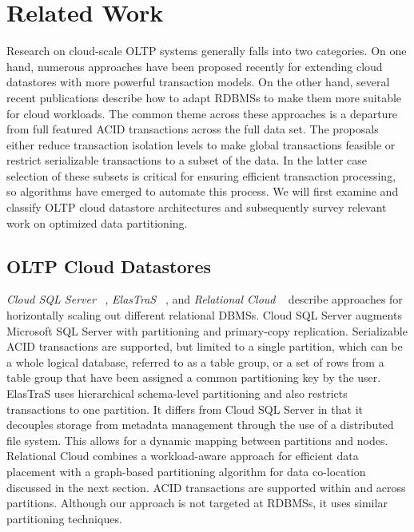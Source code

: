 \documentclass[10pt,final,journal]{IEEEtran}
\begin{document}
\section{Related Work}
Research on cloud-scale OLTP systems generally falls into two categories. On one hand, numerous approaches have been proposed recently for extending cloud datastores with more powerful transaction models. On the other hand, several recent publications describe how to adapt RDBMSs to make them more suitable for cloud workloads. The common theme across these approaches is a departure from full featured ACID transactions across the full data set. The proposals either reduce transaction isolation levels to make global transactions feasible or restrict serializable transactions to a subset of the data. In the latter case selection of these subsets is critical for ensuring efficient transaction processing, so algorithms have emerged to automate this process. We will first examine and classify OLTP cloud datastore architectures and subsequently survey relevant work on optimized data partitioning.

\subsection{OLTP Cloud Datastores}
\emph{Cloud SQL Server} ~\cite{Campbell:2010:ESF:1807167.1807280, Bernstein:2011:AMS:2004686.2005651}, \emph{ElasTraS} ~\cite{Das:2009:EET:1855533.1855540, Das:2010:EAE}, and \emph{Relational Cloud} ~\cite{Curino:2011:JPMWMBZ11} describe approaches for horizontally scaling out different relational DBMSs. Cloud SQL Server augments Microsoft SQL Server with partitioning and primary-copy replication. Serializable ACID transactions are supported, but limited to a single partition, which can be a whole logical database, referred to as a table group, or a set of rows from a table group that have been assigned a common partitioning key by the user. ElasTraS uses hierarchical schema-level partitioning and also restricts transactions to one partition. It differs from Cloud SQL Server in that it decouples storage from metadata management through the use of a distributed file system. This allows for a dynamic mapping between partitions and nodes. Relational Cloud combines a workload-aware approach for efficient data placement with a graph-based partitioning algorithm for data co-location discussed in the next section. ACID transactions are supported within and across partitions. Although our approach is not targeted at RDBMSs, it uses similar partitioning techniques.
\end{document}
